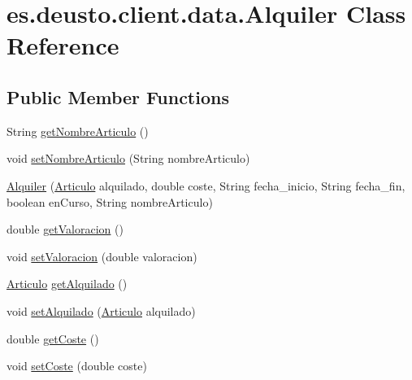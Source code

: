 \hypertarget{classes_1_1deusto_1_1client_1_1data_1_1_alquiler}{}\section{es.\+deusto.\+client.\+data.\+Alquiler Class Reference}
\label{classes_1_1deusto_1_1client_1_1data_1_1_alquiler}
\subsection*{Public Member Functions}
\begin{DoxyCompactItemize}
\item 
String \mbox{\hyperlink{classes_1_1deusto_1_1client_1_1data_1_1_alquiler_a11e67f57c043538b066ba61594bf6dfc}{get\+Nombre\+Articulo}} ()
\item 
void \mbox{\hyperlink{classes_1_1deusto_1_1client_1_1data_1_1_alquiler_aa4620743ebe7401112f0f654cbc59223}{set\+Nombre\+Articulo}} (String nombre\+Articulo)
\item 
\mbox{\hyperlink{classes_1_1deusto_1_1client_1_1data_1_1_alquiler_a87196507e38a95dcd4e7e4046e75ae5c}{Alquiler}} (\mbox{\hyperlink{classes_1_1deusto_1_1client_1_1data_1_1_articulo}{Articulo}} alquilado, double coste, String fecha\+\_\+inicio, String fecha\+\_\+fin, boolean en\+Curso, String nombre\+Articulo)
\item 
double \mbox{\hyperlink{classes_1_1deusto_1_1client_1_1data_1_1_alquiler_a8ca574c9dd9d490efb263f757354e072}{get\+Valoracion}} ()
\item 
void \mbox{\hyperlink{classes_1_1deusto_1_1client_1_1data_1_1_alquiler_af55279120b472668048444bc14ce8bcb}{set\+Valoracion}} (double valoracion)
\item 
\mbox{\hyperlink{classes_1_1deusto_1_1client_1_1data_1_1_articulo}{Articulo}} \mbox{\hyperlink{classes_1_1deusto_1_1client_1_1data_1_1_alquiler_a7a2d2190ce200df86948d728bf3564d3}{get\+Alquilado}} ()
\item 
void \mbox{\hyperlink{classes_1_1deusto_1_1client_1_1data_1_1_alquiler_aba93732bce43b85bb3d48b58f0f7c2de}{set\+Alquilado}} (\mbox{\hyperlink{classes_1_1deusto_1_1client_1_1data_1_1_articulo}{Articulo}} alquilado)
\item 
double \mbox{\hyperlink{classes_1_1deusto_1_1client_1_1data_1_1_alquiler_afb022aa6e3c81c51059554771b10fd6d}{get\+Coste}} ()
\item 
void \mbox{\hyperlink{classes_1_1deusto_1_1client_1_1data_1_1_alquiler_ac00f76e51f97fe13f2b2c399146bb14f}{set\+Coste}} (double coste)

\end{DoxyCompactItemize}
